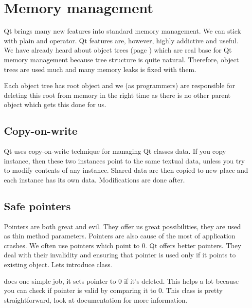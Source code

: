 \section{Memory management}\label{section:memorym}
Qt brings many new features into standard \cpp memory management. We can stick with plain and operator. Qt features are, however, highly addictive and useful. We have already heard about object trees (page \pageref{section:model}) which are real base for Qt memory management because tree structure is quite natural. Therefore, object trees are used much and many memory leaks is fixed with them.

Each object tree has root object and we (as programmers) are responsible for deleting this root from memory in the right time as there is no other parent object which gets this done for us.

\subsection{Copy-on-write}
Qt uses copy-on-write technique for managing Qt classes data. If you copy instance, then these two instances point to the same textual data, unless you try to modify contents of any instance. Shared data are then copied to new place and each instance has its own data. Modifications are done after. 

\subsection{Safe pointers}
Pointers are both great and evil. They offer us great possibilities, \eg they are used as thin method parameters. Pointers are also cause of the most of application crashes. We often use pointers which point to 0. Qt offers better pointers. They deal with their invalidity and ensuring that pointer is used only if it points to existing object. Lets introduce class. \citep[QPointer class]{various:qtdoc}

 does one simple job, it sets pointer to 0 if it's deleted. This helps a lot because you can check if pointer is valid by comparing it to 0. This class is pretty straightforward, look at documentation for more information.